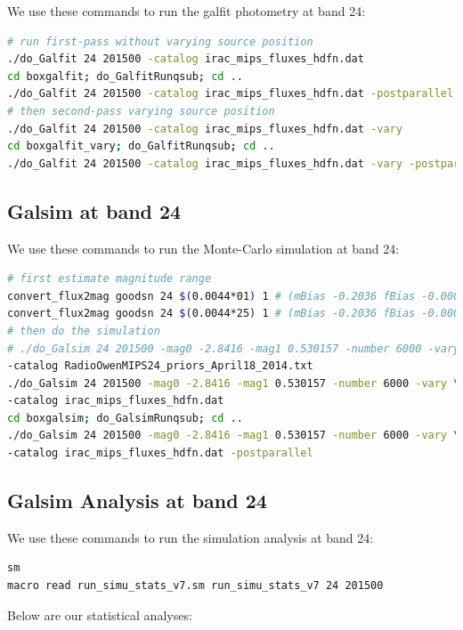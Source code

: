 \documentclass[11pt,a4paper]{article}
\begin{document}
We use these commands to run the galfit photometry at band 24:

\begin{lstlisting}[language=bash]
# run first-pass without varying source position
./do_Galfit 24 201500 -catalog irac_mips_fluxes_hdfn.dat
cd boxgalfit; do_GalfitRunqsub; cd ..
./do_Galfit 24 201500 -catalog irac_mips_fluxes_hdfn.dat -postparallel
# then second-pass varying source position
./do_Galfit 24 201500 -catalog irac_mips_fluxes_hdfn.dat -vary
cd boxgalfit_vary; do_GalfitRunqsub; cd ..
./do_Galfit 24 201500 -catalog irac_mips_fluxes_hdfn.dat -vary -postparallel
\end{lstlisting}

\subsection{Galsim at band 24}

We use these commands to run the Monte-Carlo simulation at band 24:

\begin{lstlisting}[language=bash]
# first estimate magnitude range
convert_flux2mag goodsn 24 $(0.0044*01) 1 # (mBias -0.2036 fBias -0.000553)
convert_flux2mag goodsn 24 $(0.0044*25) 1 # (mBias -0.2036 fBias -0.000553)
# then do the simulation
# ./do_Galsim 24 201500 -mag0 -2.8416 -mag1 0.530157 -number 6000 -vary \
-catalog RadioOwenMIPS24_priors_April18_2014.txt
./do_Galsim 24 201500 -mag0 -2.8416 -mag1 0.530157 -number 6000 -vary \
-catalog irac_mips_fluxes_hdfn.dat
cd boxgalsim; do_GalsimRunqsub; cd ..
./do_Galsim 24 201500 -mag0 -2.8416 -mag1 0.530157 -number 6000 -vary \
-catalog irac_mips_fluxes_hdfn.dat -postparallel
\end{lstlisting}

\subsection{Galsim Analysis at band 24}

We use these commands to run the simulation analysis at band 24:

\begin{lstlisting}[language=bash]
sm
macro read run_simu_stats_v7.sm run_simu_stats_v7 24 201500
\end{lstlisting}

Below are our statistical analyses:
\end{document}
